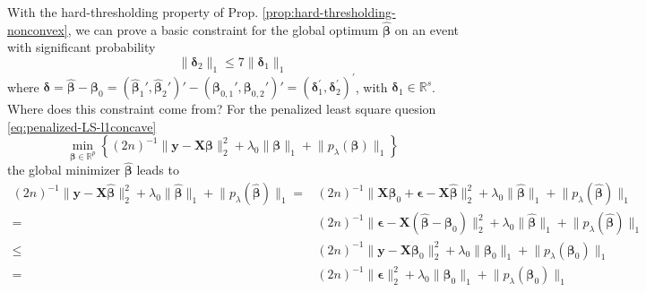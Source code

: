 \documentclass[twoside]{article}
\begin{document}
With the hard-thresholding property of Prop. \ref{prop:hard-thresholding-nonconvex}, we can prove a basic constraint for the global optimum $\hat{\boldsymbol{\beta}}$ on an event with significant probability \citep{fan2014asymptotic}
$$
\lVert \boldsymbol{\delta}_2 \rVert _1 \leq 7 \lVert \boldsymbol{\delta}_1 \rVert _1
$$
where $\boldsymbol{\delta} = \hat{\boldsymbol{\beta}}-\boldsymbol{\beta}_0 = \left( \hat{\boldsymbol{\beta}}_1',\hat{\boldsymbol{\beta}}_2' \right)' - \left( {\boldsymbol{\beta}}_{0,1}',{\boldsymbol{\beta}}_{0,2}' \right)' = \left( \boldsymbol{\delta}^{\prime}_1,\boldsymbol{\delta}^{\prime}_2 \right)^{\prime}$, with $\boldsymbol{\delta}_1\in\mathbb{R}^s$. Where does this constraint come from? For the penalized least square quesion \ref{eq:penalized-LS-l1concave}
$$
\min_{\boldsymbol{\beta}\in\mathbb{R}^p}\left\{ (2n)^{-1}\lVert \mathbf{y}-\mathbf{X}\boldsymbol{\beta} \rVert ^2_2 + \lambda_0 \lVert \boldsymbol{\beta} \rVert _1 + \lVert p_{\lambda}(\boldsymbol{\beta}) \rVert _1  \right\}
$$
the global minimizer $\hat{\boldsymbol{\beta}}$ leads to 
\begin{align*}
    (2n)^{-1}\lVert \mathbf{y}-\mathbf{X}\hat{\boldsymbol{\beta}} \rVert ^2_2 + \lambda_0 \lVert \hat{\boldsymbol{\beta}} \rVert _1 + \lVert p_{\lambda}(\hat{\boldsymbol{\beta}}) \rVert _1 =& (2n)^{-1}\lVert \mathbf{X}\boldsymbol{\beta}_0+ \boldsymbol{\epsilon} -\mathbf{X}\hat{\boldsymbol{\beta}} \rVert ^2_2 + \lambda_0 \lVert \hat{\boldsymbol{\beta}} \rVert _1 + \lVert p_{\lambda}(\hat{\boldsymbol{\beta}}) \rVert _1 \\
    =& (2n)^{-1}\lVert \boldsymbol{\epsilon} -\mathbf{X}(\hat{\boldsymbol{\beta}}- \boldsymbol{\beta}_0) \rVert ^2_2 + \lambda_0 \lVert \hat{\boldsymbol{\beta}} \rVert _1 + \lVert p_{\lambda}(\hat{\boldsymbol{\beta}}) \rVert _1 \\
    \leq &  (2n)^{-1}\lVert \mathbf{y}-\mathbf{X}{\boldsymbol{\beta}_0} \rVert ^2_2 + \lambda_0 \lVert {\boldsymbol{\beta}_0} \rVert _1 + \lVert p_{\lambda}({\boldsymbol{\beta}_0}) \rVert _1\\
    =& (2n)^{-1}\lVert {\boldsymbol{\epsilon}} \rVert ^2_2 + \lambda_0 \lVert {\boldsymbol{\beta}_0} \rVert _1 + \lVert p_{\lambda}({\boldsymbol{\beta}_0}) \rVert _1
\end{align*}
\end{document}
